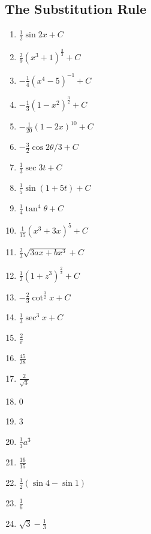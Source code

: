 \documentclass{article} \usepackage[margin=1in]{geometry}
\begin{document}
\subsection{The Substitution Rule}
\begin{enumerate}
	\item $\frac{1}{2}\sin2x+C$
	      \setcounter{enumi}{2}
	\item $\frac{2}{9}(x^3+1)^\frac{3}{2}+C$
	      \setcounter{enumi}{4}
	\item $-\frac{1}{4}(x^4-5)^{-1}+C$
	      \setcounter{enumi}{6}
	\item $-\frac{1}{3}(1-x^2)^\frac{3}{2}+C$
	      \setcounter{enumi}{8}
	\item $-\frac{1}{20}(1-2x)^{10}+C$
	      \setcounter{enumi}{10}
	\item $-\frac{3}{2}\cos{2\theta/3}+C$
	      \setcounter{enumi}{12}
	\item $\frac{1}{3}\sec3t+C$
	      \setcounter{enumi}{14}
	\item $\frac{1}{5}\sin(1+5t)+C$
	      \setcounter{enumi}{16}
	\item $\frac{1}{4}\tan^4\theta+C$
	      \setcounter{enumi}{18}
	\item $\frac{1}{15}(x^3+3x)^5+C$
	      \setcounter{enumi}{20}
	\item $\frac{2}{3}\sqrt{3ax+bx^3}+C$
	      \setcounter{enumi}{22}
	\item $\frac{1}{2}(1+z^3)^\frac{2}{3}+C$
	      \setcounter{enumi}{24}
	\item $-\frac{2}{3}\cot^{\frac{3}{2}}x+C$
	      \setcounter{enumi}{26}
	\item $\frac{1}{3}\sec^3x+C$
	      \setcounter{enumi}{34}
	\item $\frac{2}{\pi}$
	      \setcounter{enumi}{36}
	\item $\frac{45}{28}$
	      \setcounter{enumi}{38}
	\item $\frac{2}{\sqrt{3}}$
	      \setcounter{enumi}{40}
	\item 0
	      \setcounter{enumi}{42}
	\item 3
	      \setcounter{enumi}{44}
	\item $\frac{1}{3}a^3$
	      \setcounter{enumi}{46}
	\item $\frac{16}{15}$
	      \setcounter{enumi}{48}
	\item $\frac{1}{2}(\sin4-\sin1)$
	      \setcounter{enumi}{50}
	\item $\frac{1}{6}$
	      \setcounter{enumi}{52}
	\item $\sqrt{3}-\frac{1}{3}$

\end{enumerate}
\end{document}
